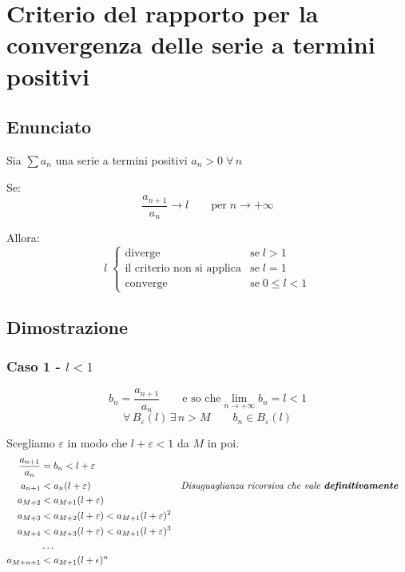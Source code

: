 \documentclass[../dimostrazioni]{subfiles}
\begin{document}
    \chapter{Criterio del rapporto per la convergenza delle serie a termini positivi}
    \label{criterioRapportoSerie}

        \section*{Enunciato}

            Sia \(\sum a_n\) una serie a termini positivi \(a_n > 0 \; \forall \, n\)
            
            Se:
             \[\frac{a_{n+1}}{a_n} \longrightarrow l \qquad  \text{per} \; n \rightarrow +\infty \]
            
            Allora:
            \[
                l \;
                \begin{cases}
                    \text{diverge} & \text{se} \; l > 1\\
                    \text{il criterio non si applica} & \text{se} \; l = 1\\
                    \text{converge} & \text{se} \; 0 \leqslant l < 1
                \end{cases}
            \]
            
        \section*{Dimostrazione}
            
            \subsection*{Caso 1 - \(l < 1\)} 
            
                \[b_n = \frac{a_{n+1}}{a_n} \qquad \text{e so che} \lim_{n \to +\infty}b_n = l < 1 \] 
                \[\forall \, B_\varepsilon (l) \, \exists \, n > M \qquad b_n \in B_\varepsilon (l) \]

                Scegliamo \(\varepsilon\) in modo che \(l + \varepsilon < 1 \) da \(M\) in poi.
                \begin{align*}
                    \frac{a_{n+1}}{a_n} &= b_n < l + \varepsilon \\
                    a_{n+1} &< a_n(l + \varepsilon) && \text{\emph{Disuguaglianza ricorsiva che vale \textbf{definitivamente}}} \\
                    a_{M+2} &< a_{M+1} (l + \varepsilon) \\
                    a_{M+3} &< a_{M+2} (l + \varepsilon) < a_{M+1}(l + \varepsilon)^{2}\\
                    a_{M+4} &< a_{M+3} (l + \varepsilon) < a_{M+1}(l + \varepsilon)^{3} \\
                    &\dots \\
                    a_{M+n+1} &< a_{M+1}(l + \epsilon)^n
                \end{align*}
\end{document}
